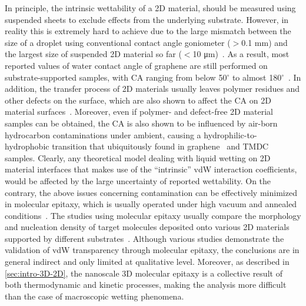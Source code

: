%
In principle, the intrinsic wettability of a 2D material, should be
measured using suspended sheets to exclude effects from the underlying
substrate.
%
However, in reality this is extremely hard to achieve due to the large
mismatch between the size of a droplet using conventional contact
angle goniometer ($>$0.1 mm) and the largest size of suspended 2D
material so far ($<$10 μm)~\autocite{Zhang_2017_transfer_suspended}.
%
As a result, most reported values of water contact angle of graphene
are still performed on substrate-supported samples, with CA ranging
from below 50$^{\circ}$ to almost
180$^{\circ}$~\autocite{Kozbial_study_2014_gr_wetting,Raj_2013_wetting_rev,Wang_2009_wettability}.
%
In addition, the transfer process of 2D materials usually leaves
polymer residues and other defects on the surface, which are also
shown to affect the CA on 2D material surfaces~\autocite{Kozbial_2015_wetting_mos2}.
%
Moreover, even if polymer- and defect-free 2D material samples can be
obtained, the CA is also shown to be influenced by air-born
hydrocarbon contaminations under ambient, causing a
hydrophilic-to-hydrophobic transition that ubiquitously found in
graphene~\autocite{li_2013_airborne} and TMDC~\autocite{Chow_2015_wetting_WS2}
samples.
%
Clearly, any theoretical model dealing with liquid wetting on 2D
material interfaces that makes use of the ``intrinsic'' vdW
interaction coefficients, would be affected by the
large uncertainty of reported wettability.
%
On the contrary, the above issues concerning contamination can be
effectively minimized in molecular epitaxy, which is usually operated
under high vacuum and annealed conditions~\autocite{Koma_1985_vdWE}.
%
%
The studies using molecular epitaxy usually compare the morphology and
nucleation density of target molecules deposited onto various 2D
materials supported by different substrates~\autocite{Kratzer_2016_6P_gr_trans,Nguyen_2015_pent_gr_wett}.
%
Although various studies demonstrate the validation of vdW
transparency through molecular epitaxy, the conclusions are in general
indirect and only limited at qualitative level.
%
Moreover, as described in \autoref{sec:intro-3D-2D}, the nanoscale 3D
molecular epitaxy is a collective result of both thermodynamic and
kinetic processes, making the analysis more difficult than the case of
macroscopic wetting phenomena.


